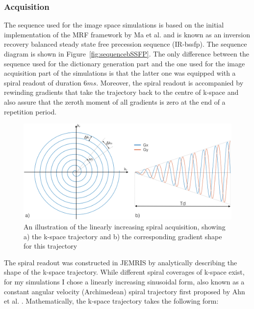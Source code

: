 \subsubsection{Acquisition}

The sequence used for the image space simulations is based on the initial implementation of the MRF framework by Ma et al. \cite{Ma2013} and is known as an inversion recovery balanced steady state free precession sequence (IR-\ac{bssfp}).
The sequence diagram is shown in Figure~\ref{fig:sequencebSSFP}.
The only difference between the sequence used for the dictionary generation part and the one used for the image acquisition part of the simulations is that the latter one was equipped with a spiral readout of duration $6 ms$.
Moreover, the spiral readout is accompanied by rewinding gradients that take the trajectory back to the centre of k-space and also assure that the zeroth moment of all gradients is zero at the end of a repetition period.

\begin{figure}[ht]
    \centering
    \includegraphics[angle=0,width=1\textwidth, keepaspectratio]{images/mrf/spiralAcquisition}
    \caption{An illustration of the linearly increasing spiral acquisition, showing a) the k-space trajectory and b) the corresponding gradient shape for this trajectory}
    \label{fig:spiralAcquisition}
\end{figure}

\hfill

The spiral readout was constructed in JEMRIS by analytically describing the shape of the k-space trajectory.
While different spiral coverages of k-space exist, for my simulations I chose a linearly increasing sinusoidal form, also known as a constant angular velocity (Archimedean) spiral trajectory first proposed by Ahn et al. \cite{Ahn1986}. 
Mathematically, the k-space trajectory takes the following form:

